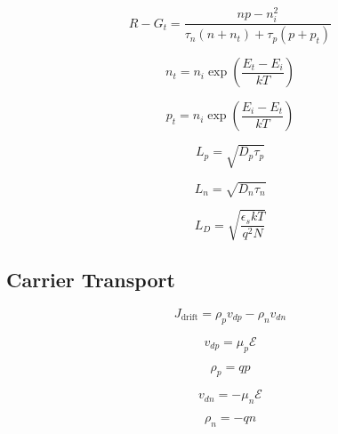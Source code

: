 \documentclass{infosheet}
\begin{document}
\begin{displaymath}
  R-G_t = \frac{np-n_i^2}{\tau_n(n+n_t) + \tau_p(p+p_t)}
\end{displaymath}

\begin{multicols}{2}
  \begin{displaymath}
    n_t = n_i\exp\left(\frac{E_t-E_i}{kT}\right)
  \end{displaymath}
  
  \begin{displaymath}
    p_t = n_i\exp\left(\frac{E_i-E_t}{kT}\right)
  \end{displaymath}
\end{multicols}

\begin{multicols}{3}
  \begin{displaymath}
    L_p = \sqrt{D_p\tau_p}
  \end{displaymath}
  
  \begin{displaymath}
    L_n = \sqrt{D_n\tau_n}
  \end{displaymath}
  
  \begin{displaymath}
    L_D = \sqrt{\frac{\epsilon_skT}{q^2N}}
  \end{displaymath}
\end{multicols}

\subsection{Carrier Transport}

\begin{displaymath}
  J_\text{drift} = \rho_p v_{dp} - \rho_n v_{dn}
\end{displaymath}

\begin{multicols}{2}
  \begin{displaymath}
    v_{dp} = \mu_p\mathcal{E}
  \end{displaymath}
  
  \begin{displaymath}
    \rho_p = qp
  \end{displaymath}

  \begin{displaymath}
    v_{dn} = -\mu_n\mathcal{E}
  \end{displaymath}
  
  \begin{displaymath}
    \rho_n = -qn
  \end{displaymath}
\end{multicols}
\end{document}
